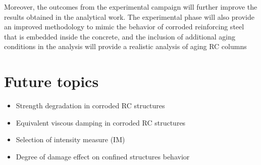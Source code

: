 Moreover, the outcomes from the experimental campaign will further improve the results obtained in the analytical work. The experimental phase will also provide an improved methodology to mimic the behavior of corroded reinforcing steel that is embedded inside the concrete, and the inclusion of additional aging conditions in the analysis will provide a realistic analysis of aging RC columns

\section{Future topics}

\begin{itemize}
	\item Strength degradation in corroded RC structures
	\item Equivalent viscous damping in corroded RC structures
	\item Selection of intensity measure (IM)
	\item Degree of damage effect on confined structures behavior
\end{itemize}